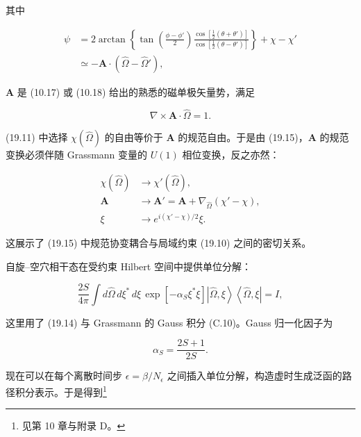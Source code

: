 其中

\begin{align*}
\psi & = 2 \arctan \left\{ \tan \left( \frac {\phi - \phi '}{2} \right) \frac {\cos \left[ \frac {1}{2} ( \theta + \theta ' ) \right]}{\cos \left[ \frac {1}{2} ( \theta - \theta ' ) \right]} \right\} + \chi - \chi '\\
& \simeq - \mathbf {A} \cdot \left( \hat {\Omega} - \hat {\Omega} ' \right) ,
\tag{19.16}
\end{align*}

$\mathbf{A}$ 是 (10.17) 或 (10.18) 给出的熟悉的磁单极矢量势，满足

\begin{equation*}
\nabla \times \mathbf {A} \cdot \hat {\Omega} = 1.
\tag{19.17}
\end{equation*}

(19.11) 中选择 $\chi(\hat{\Omega})$ 的自由等价于 $\mathbf{A}$ 的规范自由。于是由 (19.15)，$\mathbf{A}$ 的规范变换必须伴随 Grassmann 变量的 $U(1)$ 相位变换，反之亦然：

\begin{align*}
\chi ( \hat {\Omega} ) & \rightarrow \chi ' ( \hat {\Omega} ) ,\\
\mathbf {A} & \rightarrow \mathbf {A} ' = \mathbf {A} + \nabla_{\hat {\Omega}} \left( \chi ' - \chi \right) ,\\
\xi & \rightarrow e ^ {i ( \chi ' - \chi )/2} \xi .
\tag{19.18}
\end{align*}

这展示了 (19.15) 中规范协变耦合与局域约束 (19.10) 之间的密切关系。

自旋--空穴相干态在受约束 Hilbert 空间中提供单位分解：

\begin{equation*}
\frac {2S}{4 \pi} \int d \hat {\Omega} \, d \xi^ {*} \, d \xi \, \exp \left[ - \alpha_{S} \xi^ {*} \xi \right] \left| \hat {\Omega}, \xi \right\rangle \left\langle \hat {\Omega}, \xi \right| = I ,
\tag{19.19}
\end{equation*}

这里用了 (19.14) 与 Grassmann 的 Gauss 积分 (C.10)。Gauss 归一化因子为

\begin{equation*}
\alpha _ {S} = \frac {2S + 1}{2S}.
\tag{19.20}
\end{equation*}

现在可以在每个离散时间步 $\epsilon = \beta/N_{\epsilon}$ 之间插入单位分解，构造虚时生成泛函的路径积分表示。于是得到\footnote{见第 10 章与附录 D。}

